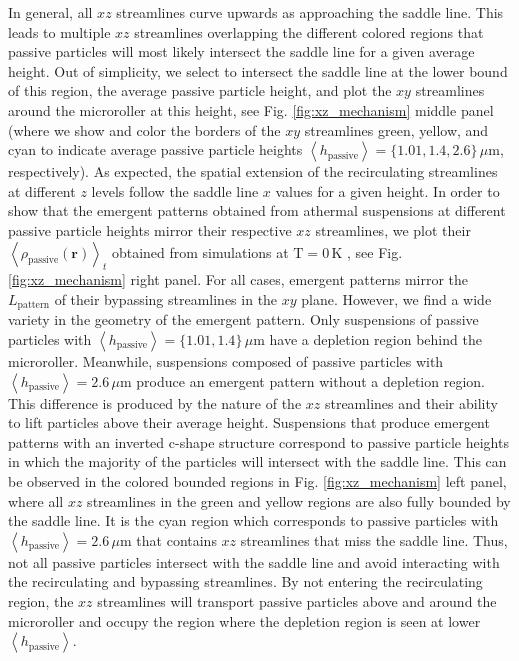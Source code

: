 \documentclass[12pt]{article}
\begin{document}
In general, all $xz$ streamlines curve upwards as approaching the saddle line. This leads to multiple $xz$ streamlines overlapping the different colored regions that passive particles will most likely intersect the saddle line for a given average height. Out of simplicity, we select to intersect the saddle line at the lower bound of this region, the average passive particle height, and plot the $xy$ streamlines around the microroller at this height, see Fig. \ref{fig:xz_mechanism} middle panel (where we show and color the borders of the $xy$ streamlines green, yellow, and cyan to indicate average passive particle heights $\left < h_\mathrm{passive} \right > =  \{1.01, 1.4,2.6\} \, \mu \mathrm{m}$, respectively). As expected, the spatial extension of the recirculating streamlines at different $z$ levels follow the saddle line $x$ values for a given height. In order to show that the emergent patterns obtained from athermal suspensions at different passive particle heights mirror their respective $xz$ streamlines, we plot their $\left < \rho_{\mathrm{passive}}\left( \mathbf{r} \right) \right >_t$ obtained from simulations at $\mathrm{T} = 0 \, \mathrm{K}$
, see Fig. \ref{fig:xz_mechanism} right panel. For all cases, emergent patterns mirror the  $L_\mathrm{pattern}$ of their bypassing streamlines in the $xy$ plane. However, we find a wide variety in the geometry of the emergent pattern. Only suspensions of passive particles with $\left < h_\mathrm{passive} \right > = \{1.01,1.4 \} \, \mu \mathrm{m}$ have a depletion region behind the microroller. Meanwhile, suspensions composed of passive particles with $\left < h_\mathrm{passive} \right >= 2.6 \, \mu \mathrm{m}$ produce an emergent pattern without a depletion region. This difference is produced by the nature of the $xz$ streamlines and their ability to lift particles above their average height. Suspensions that produce emergent patterns with an inverted c-shape structure correspond to passive particle heights in which the majority of the particles will intersect with the saddle line. This can be observed in the colored bounded regions in Fig. \ref{fig:xz_mechanism} left panel, where all $xz$ streamlines in the green and yellow regions are also fully bounded by the saddle line. It is the cyan region which corresponds to passive particles with $\left < h_\mathrm{passive} \right >= 2.6 \, \mu \mathrm{m}$ that contains $xz$ streamlines that miss the saddle line. Thus, not all passive particles intersect with the saddle line and avoid interacting with the recirculating and bypassing streamlines. By not entering the recirculating region, the $xz$  streamlines will transport passive particles above and around the microroller and occupy the region where the depletion region is seen at lower $\left < h_\mathrm{passive} \right >$. 
\end{document}
